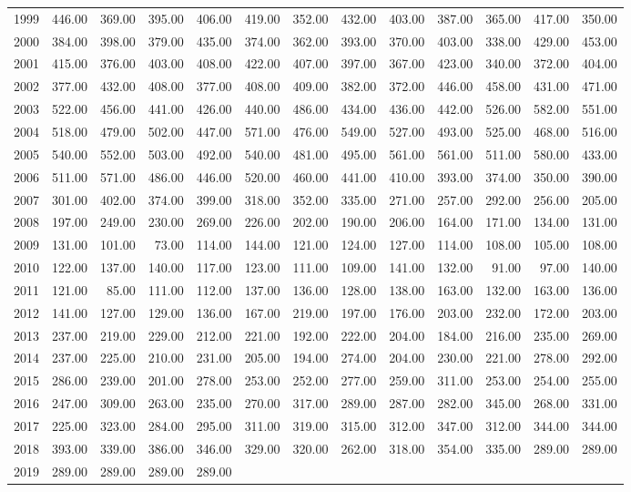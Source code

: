 \begin{longtable}{rrrrrrrrrrrrr}
  1999 & 446.00 & 369.00 & 395.00 & 406.00 & 419.00 & 352.00 & 432.00 & 403.00 & 387.00 & 365.00 & 417.00 & 350.00 \\ 
  2000 & 384.00 & 398.00 & 379.00 & 435.00 & 374.00 & 362.00 & 393.00 & 370.00 & 403.00 & 338.00 & 429.00 & 453.00 \\ 
  2001 & 415.00 & 376.00 & 403.00 & 408.00 & 422.00 & 407.00 & 397.00 & 367.00 & 423.00 & 340.00 & 372.00 & 404.00 \\ 
  2002 & 377.00 & 432.00 & 408.00 & 377.00 & 408.00 & 409.00 & 382.00 & 372.00 & 446.00 & 458.00 & 431.00 & 471.00 \\ 
  2003 & 522.00 & 456.00 & 441.00 & 426.00 & 440.00 & 486.00 & 434.00 & 436.00 & 442.00 & 526.00 & 582.00 & 551.00 \\ 
  2004 & 518.00 & 479.00 & 502.00 & 447.00 & 571.00 & 476.00 & 549.00 & 527.00 & 493.00 & 525.00 & 468.00 & 516.00 \\ 
  2005 & 540.00 & 552.00 & 503.00 & 492.00 & 540.00 & 481.00 & 495.00 & 561.00 & 561.00 & 511.00 & 580.00 & 433.00 \\ 
  2006 & 511.00 & 571.00 & 486.00 & 446.00 & 520.00 & 460.00 & 441.00 & 410.00 & 393.00 & 374.00 & 350.00 & 390.00 \\ 
  2007 & 301.00 & 402.00 & 374.00 & 399.00 & 318.00 & 352.00 & 335.00 & 271.00 & 257.00 & 292.00 & 256.00 & 205.00 \\ 
  2008 & 197.00 & 249.00 & 230.00 & 269.00 & 226.00 & 202.00 & 190.00 & 206.00 & 164.00 & 171.00 & 134.00 & 131.00 \\ 
  2009 & 131.00 & 101.00 & 73.00 & 114.00 & 144.00 & 121.00 & 124.00 & 127.00 & 114.00 & 108.00 & 105.00 & 108.00 \\ 
  2010 & 122.00 & 137.00 & 140.00 & 117.00 & 123.00 & 111.00 & 109.00 & 141.00 & 132.00 & 91.00 & 97.00 & 140.00 \\ 
  2011 & 121.00 & 85.00 & 111.00 & 112.00 & 137.00 & 136.00 & 128.00 & 138.00 & 163.00 & 132.00 & 163.00 & 136.00 \\ 
  2012 & 141.00 & 127.00 & 129.00 & 136.00 & 167.00 & 219.00 & 197.00 & 176.00 & 203.00 & 232.00 & 172.00 & 203.00 \\ 
  2013 & 237.00 & 219.00 & 229.00 & 212.00 & 221.00 & 192.00 & 222.00 & 204.00 & 184.00 & 216.00 & 235.00 & 269.00 \\ 
  2014 & 237.00 & 225.00 & 210.00 & 231.00 & 205.00 & 194.00 & 274.00 & 204.00 & 230.00 & 221.00 & 278.00 & 292.00 \\ 
  2015 & 286.00 & 239.00 & 201.00 & 278.00 & 253.00 & 252.00 & 277.00 & 259.00 & 311.00 & 253.00 & 254.00 & 255.00 \\ 
  2016 & 247.00 & 309.00 & 263.00 & 235.00 & 270.00 & 317.00 & 289.00 & 287.00 & 282.00 & 345.00 & 268.00 & 331.00 \\ 
  2017 & 225.00 & 323.00 & 284.00 & 295.00 & 311.00 & 319.00 & 315.00 & 312.00 & 347.00 & 312.00 & 344.00 & 344.00 \\ 
  2018 & 393.00 & 339.00 & 386.00 & 346.00 & 329.00 & 320.00 & 262.00 & 318.00 & 354.00 & 335.00 & 289.00 & 289.00 \\ 
  2019 & 289.00 & 289.00 & 289.00 & 289.00 &  &  &  &  &  &  &  &  \\ 
   \hline
\hline
\end{longtable}
